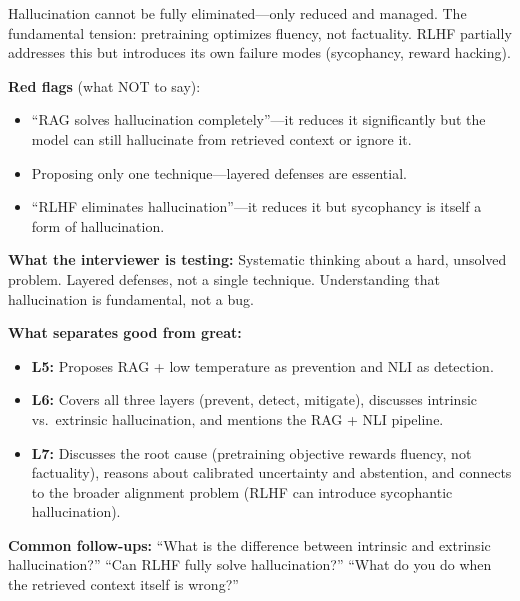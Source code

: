 \begin{interviewq}
Hallucination cannot be fully eliminated---only reduced and managed. The fundamental tension: pretraining optimizes fluency, not factuality. RLHF partially addresses this but introduces its own failure modes (sycophancy, reward hacking).

\textbf{Red flags} (what NOT to say):
\begin{itemize}
    \item ``RAG solves hallucination completely''---it reduces it significantly but the model can still hallucinate from retrieved context or ignore it.
    \item Proposing only one technique---layered defenses are essential.
    \item ``RLHF eliminates hallucination''---it reduces it but sycophancy is itself a form of hallucination.
\end{itemize}

\textbf{What the interviewer is testing:} Systematic thinking about a hard, unsolved problem. Layered defenses, not a single technique. Understanding that hallucination is fundamental, not a bug.

\textbf{What separates good from great:}
\begin{itemize}
    \item \textbf{L5:} Proposes RAG + low temperature as prevention and NLI as detection.
    \item \textbf{L6:} Covers all three layers (prevent, detect, mitigate), discusses intrinsic vs.\ extrinsic hallucination, and mentions the RAG + NLI pipeline.
    \item \textbf{L7:} Discusses the root cause (pretraining objective rewards fluency, not factuality), reasons about calibrated uncertainty and abstention, and connects to the broader alignment problem (RLHF can introduce sycophantic hallucination).
\end{itemize}

\textbf{Common follow-ups:} ``What is the difference between intrinsic and extrinsic hallucination?'' ``Can RLHF fully solve hallucination?'' ``What do you do when the retrieved context itself is wrong?''
\end{interviewq}


